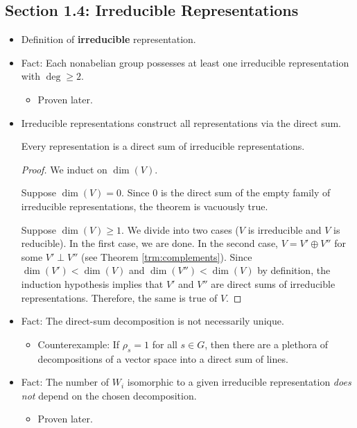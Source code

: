 \documentclass[../notes.tex]{subfiles}
\begin{document}
\subsection*{Section 1.4: Irreducible Representations}
\begin{itemize}
    \item Definition of \textbf{irreducible} representation.
    \item Fact: Each nonabelian group possesses at least one irreducible representation with $\deg\geq 2$.
    \begin{itemize}
        \item Proven later.
    \end{itemize}
    \item Irreducible representations construct all representations via the direct sum.
    \begin{theorem}\label{trm:dirSumIrrep}
        Every representation is a direct sum of irreducible representations.
        \begin{proof}
            We induct on $\dim(V)$.\par
            Suppose $\dim(V)=0$. Since 0 is the direct sum of the empty family of irreducible representations, the theorem is vacuously true.\par
            Suppose $\dim(V)\geq 1$. We divide into two cases ($V$ is irreducible and $V$ is reducible). In the first case, we are done. In the second case, $V=V'\oplus V''$ for some $V'\perp V''$ (see Theorem \ref{trm:complements}). Since $\dim(V')<\dim(V)$ and $\dim(V'')<\dim(V)$ by definition, the induction hypothesis implies that $V'$ and $V''$ are direct sums of irreducible representations. Therefore, the same is true of $V$.
        \end{proof}
    \end{theorem}
    \item Fact: The direct-sum decomposition is not necessarily unique.
    \begin{itemize}
        \item Counterexample: If $\rho_s=1$ for all $s\in G$, then there are a plethora of decompositions of a vector space into a direct sum of lines.
    \end{itemize}
    \item Fact: The number of $W_i$ isomorphic to a given irreducible representation \emph{does not} depend on the chosen decomposition.
    \begin{itemize}
        \item Proven later.
    \end{itemize}
\end{itemize}
\end{document}
